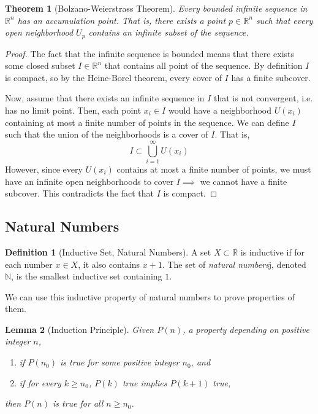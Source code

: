 \documentclass{article}
\newtheorem{theorem}{Theorem}[section]
\newtheorem{lemma}[theorem]{Lemma}
\theoremstyle{remark}
\theoremstyle{definition}
\newtheorem{definition}{Definition}[section]
\begin{document}
\begin{theorem}[Bolzano-Weierstrass Theorem]
Every bounded infinite sequence in $\mathbb{R}^n$ has an accumulation point. That is, there exists a point $p \in \mathbb{R}^n$ such that every open neighborhood $U_p$ contains an infinite subset of the sequence. 
\end{theorem}
\begin{proof}
The fact that the infinite sequence is bounded means that there exists some closed subset $I \in \mathbb{R}^n$ that contains all point of the sequence. By definition $I$ is compact, so by the Heine-Borel theorem, every cover of $I$ has a finite subcover. 

Now, assume that there exists an infinite sequence in $I$ that is not convergent, i.e. has no limit point. Then, each point $x_i \in I$ would have a neighborhood $U(x_i)$ containing at most a finite number of points in the sequence. We can define $I$ such that the union of the neighborhoods is a cover of $I$. That is, 
\[I \subset \bigcup_{i=1}^\infty U(x_i)\]
However, since every $U(x_i)$ contains at most a finite number of points, we must have an infinite open neighborhoods to cover $I \implies$ we cannot have a finite subcover. This contradicts the fact that $I$ is compact. 
\end{proof}


\subsection{Natural Numbers}
\begin{definition}[Inductive Set, Natural Numbers]
A set $X \subset \mathbb{R}$ is inductive if for each number $x \in X$, it also contains $x + 1$. The set of \textit{natural numbers}j, denoted $\mathbb{N}$, is the smallest inductive set containing $1$. 
\end{definition}

We can use this inductive property of natural numbers to prove properties of them. 

\begin{lemma}[Induction Principle]
Given $P(n)$, a property depending on positive integer $n$, 
\begin{enumerate}
    \item if $P(n_0)$ is true for some positive integer $n_0$, and
    \item if for every $k \geq n_0$, $P(k)$ true implies $P(k+1)$ true, 
\end{enumerate}
then $P(n)$ is true for all $n \geq n_0$. 
\end{lemma}
\end{document}
